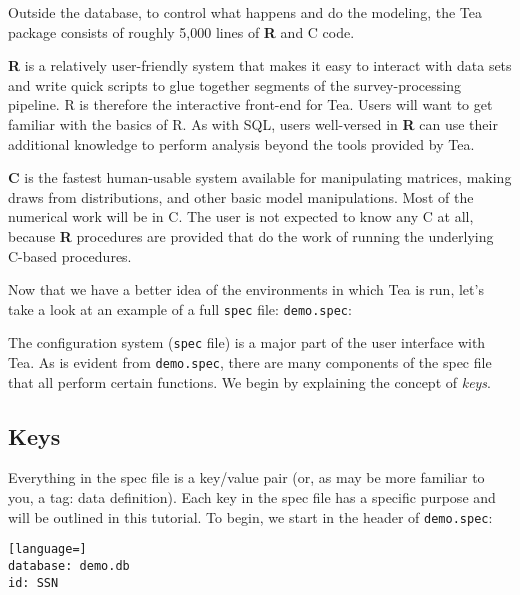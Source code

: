 \documentclass{article}
\begin{document}
Outside the database, to control what happens and
do the modeling, the Tea package consists of roughly 5,000 lines of \textbf{R} and C code.

{\bf R} is a relatively user-friendly system that makes it easy to interact with data
sets and write quick scripts to glue together segments of the survey-processing pipeline.
R is therefore the interactive front-end for Tea. Users will want to get familiar with
the basics of R.  As with SQL, users well-versed in \textbf{R} can use their additional
knowledge to perform analysis beyond the tools provided by Tea.

{\bf C} is the fastest human-usable system available for manipulating matrices, making
draws from distributions, and other basic model manipulations. Most of the numerical
work will be in C. The user is not expected to know any C at all, because \textbf{R} procedures
are provided that do the work of running the underlying C-based procedures.

Now that we have a better idea of the environments in which Tea is run, let's take a look  
at an example of a full {\tt spec} file: {\tt demo.spec}:


%


The configuration system ({\tt spec} file) is a major part of the user interface with Tea. 
As is evident from {\tt demo.spec}, there are many components of the spec file that all 
perform certain functions. We begin by explaining the concept of \textit{keys}.

\subsection{Keys}
Everything in the spec file is a key/value pair (or, as may be more familiar to 
you, a tag: data definition). Each key in the spec file has a specific purpose and 
will be outlined in this tutorial.
To begin, we start in the header of {\tt demo.spec}:

\begin{lstlisting}[language=]
database: demo.db
id: SSN
\end{lstlisting}
\end{document}
